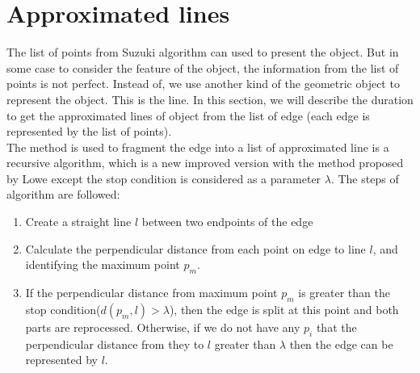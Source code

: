 \section{Approximated lines}
The list of points from Suzuki algorithm can used to present the object. But in some case to consider the feature of the object, the information from the list of points is not perfect. Instead of, we use another kind of the geometric object to represent the object. This is the line. In this section, we will describe the duration to get the approximated lines of object from the list of edge (each edge is represented by the list of points).\\[0.2cm]
The method is used to fragment the edge into a list of approximated line is a recursive algorithm\cite{thacker1995assessing}, which is a new improved version with the method proposed by Lowe\cite{lowe1987three} except the stop condition is considered as a parameter $\lambda$. The steps of algorithm are followed:
\begin{enumerate}
	\item Create a straight line $l$ between two endpoints of the edge
	\item Calculate the perpendicular distance from each point on edge to line $l$, and identifying the maximum point $p_m$.
	\item If the perpendicular distance from maximum point $p_m$ is greater than the stop condition($d(p_m,l) > \lambda$), then the edge is split at this point and both parts are reprocessed. Otherwise, if we do not have any $p_i$ that the perpendicular distance from they to $l$ greater than $\lambda$ then the edge can be represented by $l$. 
\end{enumerate}

